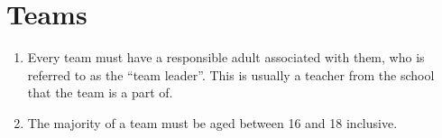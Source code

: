 \section{Teams}

\begin{enumerate}

\item Every team must have a responsible adult associated with them, who is referred to as the ``team leader''.  This is usually a teacher from the school that the team is a part of.

\item The majority of a team must be aged between 16 and 18 inclusive.

\end{enumerate}
